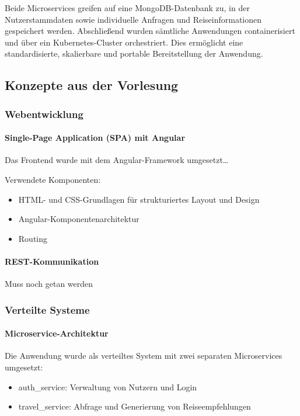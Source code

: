 Beide Microservices greifen auf eine MongoDB-Datenbank zu, in der Nutzerstammdaten sowie individuelle Anfragen und Reiseinformationen gespeichert werden.  
Abschließend wurden sämtliche Anwendungen containerisiert und über ein Kubernetes-Cluster orchestriert. Dies ermöglicht eine standardisierte, skalierbare und portable Bereitstellung der Anwendung.

\subsection{Konzepte aus der Vorlesung}

\subsubsection{Webentwicklung}

\paragraph{Single-Page Application (SPA) mit Angular}  
Das Frontend wurde mit dem Angular-Framework umgesetzt…  

Verwendete Komponenten:
\begin{itemize}
  \item HTML- und CSS-Grundlagen für strukturiertes Layout und Design
  \item Angular-Komponentenarchitektur
  \item Routing
\end{itemize}

\paragraph{REST-Kommunikation}  
Muss noch getan werden

\subsubsection{Verteilte Systeme}

\paragraph{Microservice-Architektur}  
Die Anwendung wurde als verteiltes System mit zwei separaten Microservices umgesetzt:
\begin{itemize}
  \item auth\_service: Verwaltung von Nutzern und Login
  \item travel\_service: Abfrage und Generierung von Reiseempfehlungen
\end{itemize}

